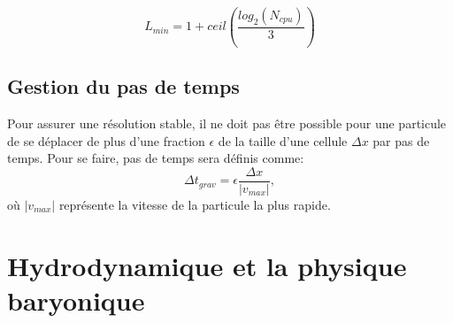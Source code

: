 \begin{equation}
L_{min} = 1 + ceil \left(\frac{log_2(N_{cpu})}{3}  \right) 
\end{equation}


%
%


%

\subsection{Gestion du pas de temps}
\label{sec:dtgrav}

Pour assurer une résolution stable, il ne doit pas être possible pour une particule de se déplacer de plus d'une fraction $\epsilon$ de la taille d'une cellule $\Delta x$ par pas de temps.
Pour se faire, pas de temps sera définis comme:
\begin{equation}
\Delta t_{grav} = \epsilon \frac{\Delta x}{|v_{max}|},
\end{equation}
où $|v_{max}|$ représente la vitesse de la particule la plus rapide.


\clearpage
\section{Hydrodynamique et la physique baryonique}
\label{sec:hydro}
%
%


